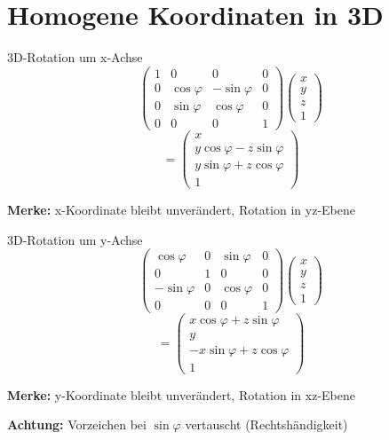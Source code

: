 \documentclass[a4paper, fontsize=7pt]{scrartcl}
\begin{document}
\section{Homogene Koordinaten in 3D}

\begin{mainbox}{3D-Rotation um x-Achse}
\[\begin{pmatrix}
1 & 0 & 0 & 0 \\
0 & \cos\varphi & -\sin\varphi & 0 \\
0 & \sin\varphi & \cos\varphi & 0 \\
0 & 0 & 0 & 1
\end{pmatrix} \begin{pmatrix} x \\ y \\ z \\ 1 \end{pmatrix}\]
\[= \begin{pmatrix} x \\ y\cos\varphi - z\sin\varphi \\ y\sin\varphi + z\cos\varphi \\ 1 \end{pmatrix}\]

\textbf{Merke:} x-Koordinate bleibt unverändert, Rotation in yz-Ebene
\end{mainbox}

\begin{mainbox}{3D-Rotation um y-Achse}
\[\begin{pmatrix}
\cos\varphi & 0 & \sin\varphi & 0 \\
0 & 1 & 0 & 0 \\
-\sin\varphi & 0 & \cos\varphi & 0 \\
0 & 0 & 0 & 1
\end{pmatrix} \begin{pmatrix} x \\ y \\ z \\ 1 \end{pmatrix}\]
\[= \begin{pmatrix} x\cos\varphi + z\sin\varphi \\ y \\ -x\sin\varphi + z\cos\varphi \\ 1 \end{pmatrix}\]

\textbf{Merke:} y-Koordinate bleibt unverändert, Rotation in xz-Ebene

\textbf{Achtung:} Vorzeichen bei $\sin\varphi$ vertauscht (Rechtshändigkeit)
\end{mainbox}
\end{document}

